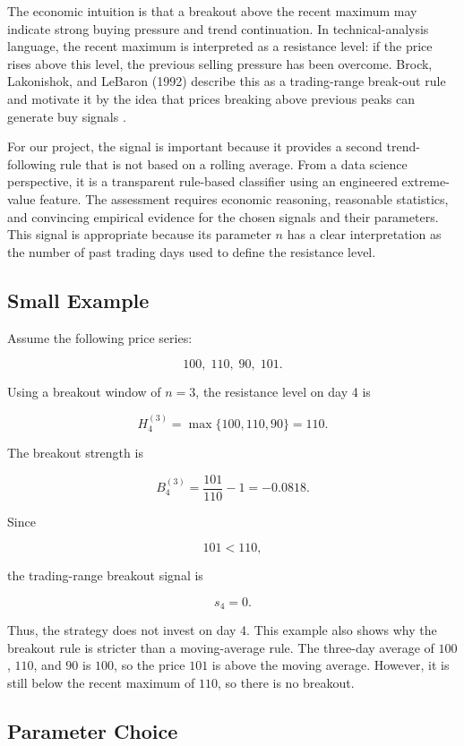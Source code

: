\documentclass[11pt]{article}
\begin{document}
The economic intuition is that a breakout above the recent maximum may indicate
strong buying pressure and trend continuation. In technical-analysis language,
the recent maximum is interpreted as a resistance level: if the price rises above
this level, the previous selling pressure has been overcome. Brock, Lakonishok,
and LeBaron (1992) describe this as a trading-range break-out rule and motivate
it by the idea that prices breaking above previous peaks can generate buy
signals \cite[p.~1736]{brock1992}.

For our project, the signal is important because it provides a second
trend-following rule that is not based on a rolling average. From a data science
perspective, it is a transparent rule-based classifier using an engineered
extreme-value feature. The assessment requires economic reasoning, reasonable
statistics, and convincing empirical evidence for the chosen signals and their
parameters. This signal is appropriate because its parameter $n$ has a clear
interpretation as the number of past trading days used to define the resistance
level.

\subsection*{Small Example}

Assume the following price series:

\[
100,\; 110,\; 90,\; 101.
\]

Using a breakout window of $n=3$, the resistance level on day 4 is

\[
H_4^{(3)} = \max\{100, 110, 90\} = 110.
\]

The breakout strength is

\[
B_4^{(3)} = \frac{101}{110} - 1 = -0.0818.
\]

Since

\[
101 < 110,
\]

the trading-range breakout signal is

\[
s_4 = 0.
\]

Thus, the strategy does not invest on day 4. This example also shows why the
breakout rule is stricter than a moving-average rule. The three-day average of
$100$, $110$, and $90$ is $100$, so the price $101$ is above the moving average.
However, it is still below the recent maximum of $110$, so there is no breakout.

\subsection*{Parameter Choice}
\end{document}
